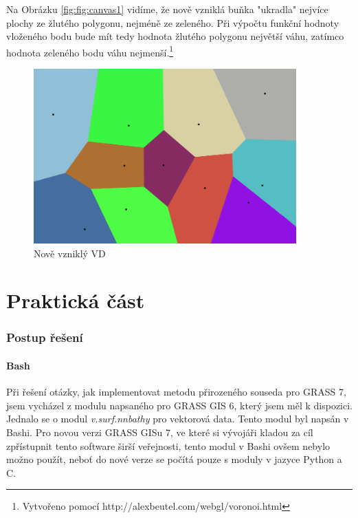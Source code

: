 \documentclass[12pt,a4paper]{article}
\begin{document}
\newpage
Na Obrázku \ref{fig:fig:canvas1} vidíme, že nově vzniklá buňka "ukradla" nejvíce plochy ze žlutého polygonu, nejméně ze zeleného. Při výpočtu funkční hodnoty vloženého bodu bude mít tedy hodnota žlutého polygonu největší váhu, zatímco hodnota zeleného bodu váhu nejmenší.\footnote{Vytvořeno pomocí http://alexbeutel.com/webgl/voronoi.html}
\begin{figure}[h!]
\centering
\includegraphics[width=0.9\textwidth]{img/canvas_2.png}
\caption{Nově vzniklý VD}
\label{fig:fig:canvas2}
\end{figure}


\newpage	
\part{Praktická část}

\newpage
\section{Postup řešení}
\subsection{Bash}
Při řešení otázky, jak implementovat metodu přirozeného souseda pro GRASS 7, jsem vycházel z modulu napsaného pro GRASS GIS 6, který jsem měl k dispozici. Jednalo se o modul \emph{v.surf.nnbathy} pro vektorová data. Tento modul byl napsán v Bashi. Pro novou verzi GRASS GISu 7, ve které si vývojáři kladou za cíl zpřístupnit tento software širší veřejnosti, tento modul v Bashi ovšem nebylo možno použít, neboť do nové verze se počítá pouze s moduly v jazyce Python a C.
\end{document}

